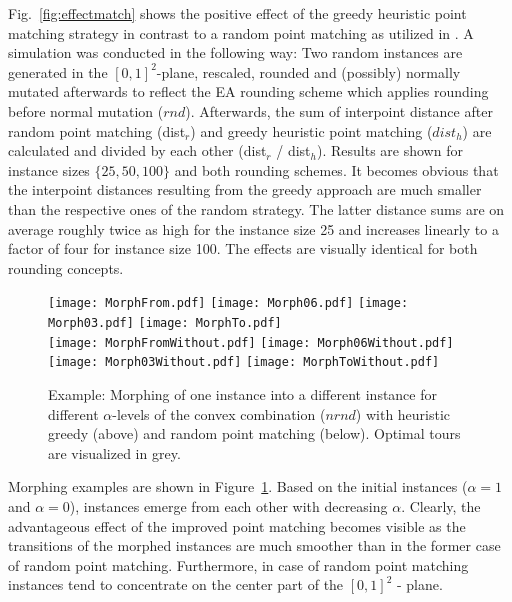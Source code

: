 \documentclass{article}
\begin{document}
Fig.~\ref{fig:effectmatch} shows the positive effect of the greedy
heuristic point matching strategy in contrast to a random point
matching as utilized in \cite{mersmann2012}. A simulation was
conducted in the following way: Two random instances are generated in
the $[0,1]^2$-plane, rescaled, rounded and (possibly) normally mutated
afterwards to reflect the EA rounding scheme which applies rounding
before normal mutation ($rnd$). Afterwards, the sum of interpoint
distance after random point matching (dist$_r$) and greedy heuristic
point matching ($dist_h$) are calculated and divided by each other
(dist$_r$ / dist$_h$). Results are shown for instance sizes
$\{25,50,100\}$ and both rounding schemes. It becomes obvious that the
interpoint distances resulting from the greedy approach are much
smaller than the respective ones of the random strategy. The latter
distance sums are on average roughly twice as high for the instance
size 25 and increases linearly to a factor of four for instance size
100. The effects are visually identical for both rounding concepts.

\begin{figure}
  \centering
  \texttt{[image: MorphFrom.pdf]}
  \texttt{[image: Morph06.pdf]}
  \texttt{[image: Morph03.pdf]}
  \texttt{[image: MorphTo.pdf]}\\
  \texttt{[image: MorphFromWithout.pdf]}
  \texttt{[image: Morph06Without.pdf]}
  \texttt{[image: Morph03Without.pdf]}
  \texttt{[image: MorphToWithout.pdf]}\\
  \caption{Example: Morphing of one instance into a different instance
    for different $\alpha$-levels of the convex combination ($nrnd$)
    with heuristic greedy (above) and random point matching
    (below). Optimal tours are visualized in grey.}
  \label{fig:morphsketch}
\end{figure}

Morphing examples are shown in Figure~\ref{fig:morphsketch}. Based on
the initial instances ($\alpha=1$ and $\alpha=0$), instances emerge
from each other with decreasing $\alpha$. Clearly, the advantageous
effect of the improved point matching becomes visible as the
transitions of the morphed instances are much smoother than in the
former case of random point matching. Furthermore, in case of random
point matching instances tend to concentrate on the center part of the
$[0,1]^2$ - plane.
\end{document}
